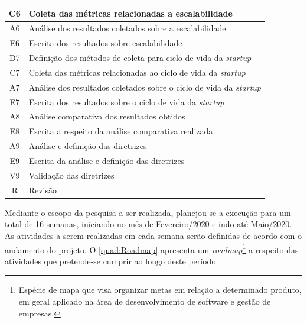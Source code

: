 \begin{quadro}
\begin{tabular}{ | c | m{12cm} | }
        C6 & Coleta das métricas relacionadas a escalabilidade \\ \hline
        A6 & Análise dos resultados coletados sobre a escalabilidade \\ \hline
        E6 & Escrita dos resultados sobre escalabilidade \\ \hline
        D7 & Definição dos métodos de coleta para ciclo de vida da \textit{startup} \\ \hline
        C7 & Coleta das métricas relacionadas ao ciclo de vida da \textit{startup} \\ \hline
        A7 & Análise dos resultados coletados sobre o ciclo de vida da \textit{startup} \\ \hline
        E7 & Escrita dos resultados sobre o ciclo de vida da \textit{startup} \\ \hline
        A8 & Análise comparativa dos resultados obtidos \\ \hline
        E8 & Escrita a respeito da análise comparativa realizada \\ \hline
        A9 & Análise e definição das diretrizes \\ \hline
        E9 & Escrita da análise e definição das diretrizes \\ \hline
        V9 & Validação das diretrizes \\ \hline
        R  & Revisão
    \end{tabular}
\end{quadro}

Mediante o escopo da pesquisa a ser realizada, planejou-se a execução para um total
de 16 semanas, iniciando no mês de Fevereiro/2020 e indo até Maio/2020. As atividades
a serem realizadas em cada semana serão definidas de acordo com o andamento do projeto.
O \autoref{quad:Roadmap} apresenta um \textit{roadmap}\footnote{Espécie de mapa que
visa organizar metas em relação a determinado produto, em geral aplicado na área de
desenvolvimento de software e gestão de empresas.} a respeito das atividades que
pretende-se cumprir ao longo deste período.

